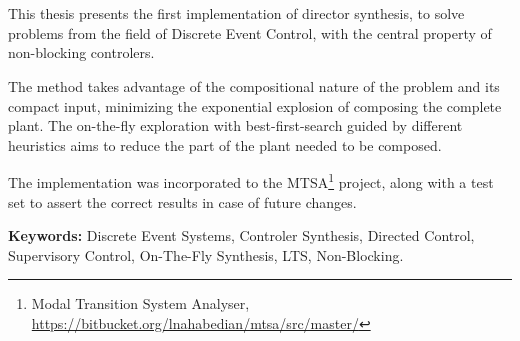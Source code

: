 \chapter*{\runtitle}

\noindent 

This thesis presents the first implementation of director synthesis, to solve problems from the field of Discrete Event Control, with the central property of non-blocking controlers.

The method takes advantage of the compositional nature of the problem and its compact input, minimizing the exponential explosion of composing the complete plant. The on-the-fly exploration with best-first-search guided by different heuristics aims to reduce the part of the plant needed to be composed. 

The implementation was incorporated to the MTSA\footnote{Modal Transition System Analyser, \href{https://bitbucket.org/lnahabedian/mtsa/src/master/^}{https://bitbucket.org/lnahabedian/mtsa/src/master/}} project, along with a test set to assert the correct results in case of future changes.

\bigskip

\noindent\textbf{Keywords:} Discrete Event Systems, Controler Synthesis, Directed Control, Supervisory Control, On-The-Fly Synthesis, LTS, Non-Blocking.